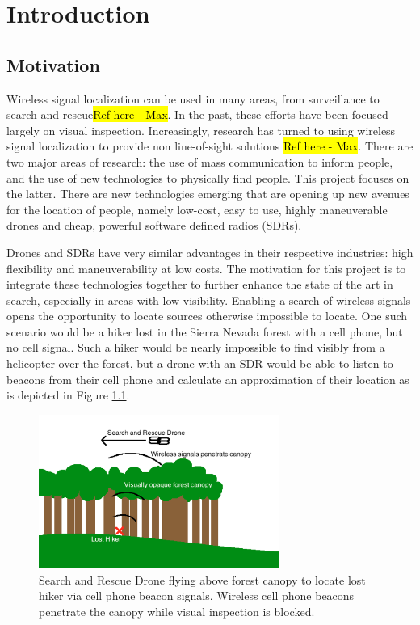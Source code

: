 \chapter{Introduction}

\section{Motivation}
Wireless signal localization can be used in many areas, from surveillance to search and rescue\hl{Ref here - Max}. In the past, these efforts have been focused largely on visual inspection. Increasingly, research has turned to using wireless signal localization to provide non line-of-sight solutions \hl{Ref here - Max}. There are two major areas of research: the use of mass communication to inform people, and the use of new technologies to physically find people. This project focuses on the latter. There are new technologies emerging that are opening up new avenues for the location of people, namely low-cost, easy to use, highly maneuverable drones and cheap, powerful software defined radios (SDRs). \par
Drones and SDRs have very similar advantages in their respective industries: high flexibility and maneuverability at low costs. The motivation for this project is to integrate these technologies together to further enhance the state of the art in search, especially in areas with low visibility. Enabling a search of wireless signals opens the opportunity to locate sources otherwise impossible to locate. One such scenario would be a hiker lost in the Sierra Nevada forest with a cell phone, but no cell signal. Such a hiker would be nearly impossible to find visibly from a helicopter over the forest, but a drone with an SDR would be able to listen to beacons from their cell phone and calculate an approximation of their location as is depicted in Figure \ref{fig:sar_drone_forest}. \par
\begin{figure}[h!]
\centering
\includegraphics[width=0.70\textwidth]{img/sar_drone_forest}
\caption{Search and Rescue Drone flying above forest canopy to locate lost hiker via cell phone beacon signals. Wireless cell phone beacons penetrate the canopy while visual inspection is blocked.}
\label{fig:sar_drone_forest}
\end{figure}
